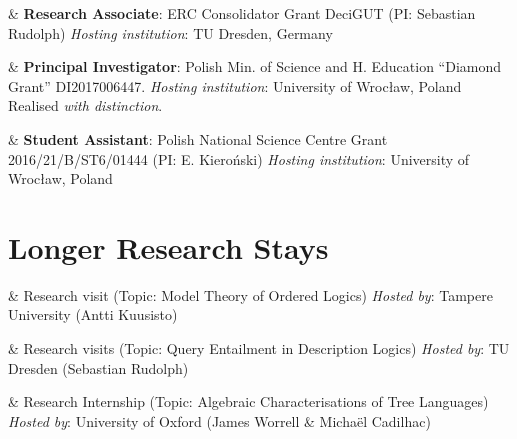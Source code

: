 \documentclass[10pt,a4paper]{article}
\begin{document}
\begin{EntriesTableDuration}
    & 
  \textbf{Research Associate}: ERC Consolidator Grant DeciGUT (PI: Sebastian Rudolph)\newline
  \emph{Hosting institution}: TU Dresden, Germany
\end{EntriesTableDuration}

\begin{EntriesTableDuration}
    & 
  \textbf{Principal Investigator}: Polish Min. of Science and H. Education ``Diamond Grant''  DI2017006447.\newline
  \emph{Hosting institution}: University of Wrocław, Poland\newline
  Realised \emph{with distinction}.
\end{EntriesTableDuration}

\begin{EntriesTableDuration}
    & 
  \textbf{Student Assistant}: Polish National Science Centre Grant 2016/21/B/ST6/01444 (PI: E. Kieroński)\newline
  \emph{Hosting institution}: University of Wrocław, Poland
\end{EntriesTableDuration}


\section{Longer Research Stays}

\begin{EntriesTableYear}
    & 
  Research visit (Topic: Model Theory of Ordered Logics)\newline
  \emph{Hosted by}: Tampere University (Antti Kuusisto)
\end{EntriesTableYear}

\begin{EntriesTableYear}
    & 
  Research visits (Topic: Query Entailment in Description Logics)\newline
  \emph{Hosted by}: TU Dresden (Sebastian Rudolph)
\end{EntriesTableYear}

\begin{EntriesTableYear}
    & 
  Research Internship (Topic: Algebraic Characterisations of Tree Languages)\newline
  \emph{Hosted by}: University of Oxford (James Worrell \& Michaël Cadilhac)
\end{EntriesTableYear}
\end{document}

